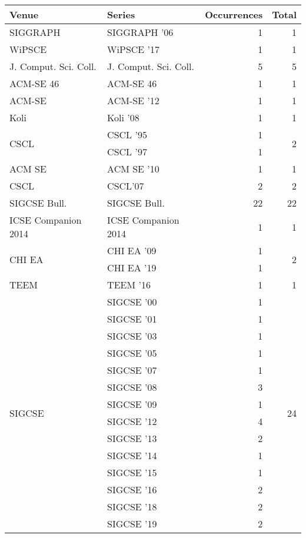 \begin{table*}[t]
\begin{tabular}{llrr}
Venue & Series & Occurrences & Total\\\hline
\multirow{1}{*}{SIGGRAPH } & SIGGRAPH '06 & 1 & \multirow{1}{*}{1}\\
\multirow{1}{*}{WiPSCE } & WiPSCE '17 & 1 & \multirow{1}{*}{1}\\
\multirow{1}{*}{J. Comput. Sci. Coll.} & J. Comput. Sci. Coll. & 5 & \multirow{1}{*}{5}\\
\multirow{1}{*}{ACM-SE 46} & ACM-SE 46 & 1 & \multirow{1}{*}{1}\\
\multirow{1}{*}{ACM-SE } & ACM-SE '12 & 1 & \multirow{1}{*}{1}\\
\multirow{1}{*}{Koli } & Koli '08 & 1 & \multirow{1}{*}{1}\\
\multirow{2}{*}{CSCL } & CSCL '95 & 1 & \multirow{2}{*}{2}\\
& CSCL '97 & 1 &\\
\multirow{1}{*}{ACM SE } & ACM SE '10 & 1 & \multirow{1}{*}{1}\\
\multirow{1}{*}{CSCL} & CSCL'07 & 2 & \multirow{1}{*}{2}\\
\multirow{1}{*}{SIGCSE Bull.} & SIGCSE Bull. & 22 & \multirow{1}{*}{22}\\
\multirow{1}{*}{ICSE Companion 2014} & ICSE Companion 2014 & 1 & \multirow{1}{*}{1}\\
\multirow{2}{*}{CHI EA } & CHI EA '09 & 1 & \multirow{2}{*}{2}\\
& CHI EA '19 & 1 &\\
\multirow{1}{*}{TEEM } & TEEM '16 & 1 & \multirow{1}{*}{1}\\
\multirow{15}{*}{SIGCSE } & SIGCSE '00 & 1 & \multirow{15}{*}{24}\\
& SIGCSE '01 & 1 &\\
& SIGCSE '03 & 1 &\\
& SIGCSE '05 & 1 &\\
& SIGCSE '07 & 1 &\\
& SIGCSE '08 & 3 &\\
& SIGCSE '09 & 1 &\\
& SIGCSE '12 & 4 &\\
& SIGCSE '13 & 2 &\\
& SIGCSE '14 & 1 &\\
& SIGCSE '15 & 1 &\\
& SIGCSE '16 & 2 &\\
& SIGCSE '18 & 2 &\\
& SIGCSE '19 & 2 &\\

\end{tabular}
\end{table*}
